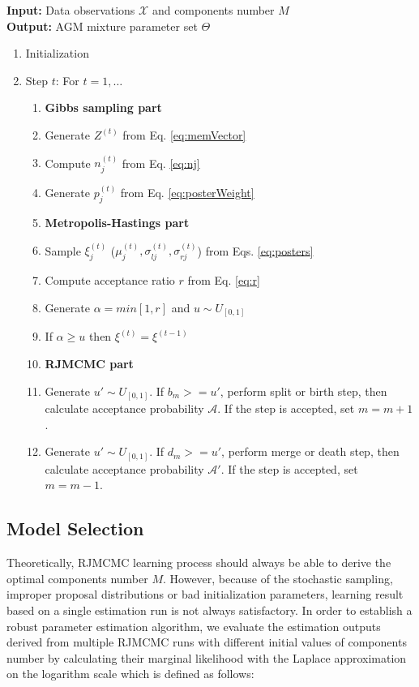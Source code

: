 \documentclass[conference]{IEEEtran}
\begin{document}
\noindent\textbf{Input:} Data observations $\mathcal{X}$ and components number $M$ \\
\textbf{Output:} AGM mixture parameter set $\Theta$
\begin{enumerate}
\item Initialization
\item Step $t$: For $t = 1,\ldots$
\begin{enumerate}
\item[]\textbf{Gibbs sampling part}
\item Generate $Z^{(t)}$ from Eq. \eqref{eq:memVector}
\item Compute $n_j^{(t)}$ from Eq. \eqref{eq:nj}
\item Generate $p_j^{(t)}$ from Eq. \eqref{eq:posterWeight}
\item[] \textbf{Metropolis-Hastings part}
\item Sample $\xi_j^{(t)}$ ($\mu_j^{(t)}, \sigma_{lj}^{(t)}, \sigma_{rj}^{(t)}$) from Eqs. \eqref{eq:posters}
\item Compute acceptance ratio $r$ from Eq. \eqref{eq:r}
\item Generate $\alpha = min[1,r]$ and $u \sim U_{[0,1]}$
\item If $\alpha \geq u$ then $\xi^{(t)} = \xi^{(t-1)}$
\item[] \textbf{RJMCMC part}
\item Generate $u' \sim U_{[0,1]}$. If $b_m>=u'$, perform split or birth step, then calculate acceptance probability $\mathcal{A}$. If the step is accepted, set $m=m+1$.
\item Generate $u' \sim U_{[0,1]}$. If $d_m>=u'$, perform merge or death step, then calculate acceptance probability $\mathcal{A}'$. If the step is accepted, set $m=m-1$.
\end{enumerate}
\end{enumerate}



\subsection{Model Selection}
Theoretically, RJMCMC learning process should always be able to derive the optimal components number $M$. However, because of the stochastic sampling, improper proposal distributions or bad initialization parameters, learning result based on a single estimation run is not always satisfactory. In order to establish a robust parameter estimation algorithm, we evaluate the estimation outputs derived from multiple RJMCMC runs with different initial values of components number by calculating their marginal likelihood with the Laplace approximation\cite{Bouguila2009} on the logarithm scale which is defined as follows:
\end{document}
